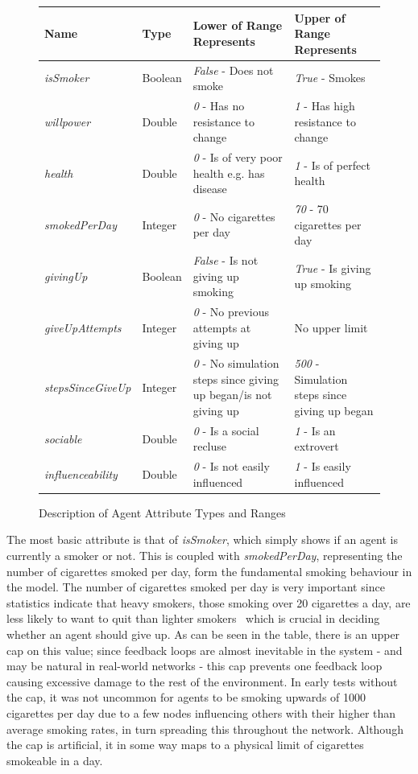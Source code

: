 \documentclass[]{report}
\begin{document}
\begin{figure}
\begin{center}
\begin{tabular}{|l||l|p{5cm}|p{5cm}|}
\hline
\bf{Name} & \bf{Type} & \bf{Lower of Range Represents} & \bf{Upper of Range Represents} \\
\hline
\emph{isSmoker} 					& Boolean & \emph{False} - Does not smoke											& \emph{True} - Smokes \\
\emph{willpower}					&	Double	&	\emph{0} - Has no resistance to change							& \emph{1} - Has high resistance to change \\
\emph{health}						&	Double	&	\emph{0} - Is of very poor health e.g. has disease &	\emph{1} - Is of perfect health \\
\emph{smokedPerDay}			&	Integer	&	\emph{0} - No cigarettes per day										& \emph{70} - 70 cigarettes per day \\
\emph{givingUp}					&	Boolean	&	\emph{False} - Is not giving up smoking						& \emph{True} - Is giving up smoking \\
\emph{giveUpAttempts}		&	Integer	&	\emph{0} - No previous attempts at giving up				& No upper limit \\
\emph{stepsSinceGiveUp}	&	Integer	&	\emph{0} - No simulation steps since giving up began/is not giving up	& \emph{500} - Simulation steps since giving up began \\
\emph{sociable}					&	Double	&	\emph{0} - Is a social recluse											& \emph{1}	- Is an extrovert \\
\emph{influenceability}	&	Double	&	\emph{0} - Is not easily influenced								& \emph{1} - Is easily influenced \\
\hline

\end{tabular}
\end{center}
\caption{Description of Agent Attribute Types and Ranges}
\label{tab:attr}
\end{figure}


The most basic attribute is that of \emph{isSmoker}, which simply shows if an agent is currently a smoker or not. This is coupled with \emph{smokedPerDay}, representing the number of cigarettes smoked per day, form the fundamental smoking behaviour in the model. The number of cigarettes smoked per day is very important since statistics indicate that heavy smokers, those smoking over 20 cigarettes a day, are less likely to want to quit than lighter smokers~\cite{NHS-43} which is crucial in deciding whether an agent should give up. As can be seen in the table, there is an upper cap on this value; since feedback loops are almost inevitable in the system  - and may be natural in real-world networks - this cap prevents one feedback loop causing excessive damage to the rest of the environment. In early tests without the cap, it was not uncommon for agents to be smoking upwards of 1000 cigarettes per day due to a few nodes influencing others with their higher than average smoking rates, in turn spreading this throughout the network. Although the cap is artificial, it in some way maps to a physical limit of cigarettes smokeable in a day.
\end{document}
